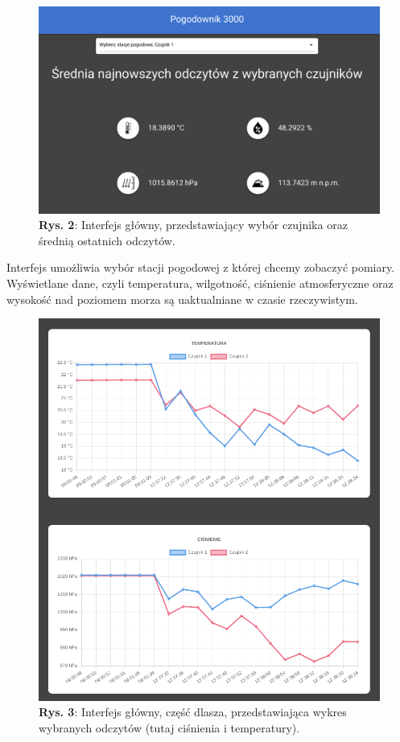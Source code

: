 \documentclass[12pt,a4paper]{article}
\begin{document}
    \begin{figure}[ht]
    \centering
    \includegraphics*[scale=0.3]{int1.png}
    \caption*{\centering \textbf{Rys. 2}: Interfejs główny, przedstawiający wybór czujnika oraz średnią ostatnich odczytów.}
    \end{figure}


    Interfejs umożliwia wybór stacji pogodowej z której chcemy zobaczyć pomiary. Wyświetlane dane, czyli temperatura, wilgotność, ciśnienie atmosferyczne oraz wysokość nad poziomem morza są uaktualniane w czasie rzeczywistym. \\

    \pagebreak
    \begin{figure}[h]
    \centering
    \includegraphics*[scale=0.4]{int2.png}
    \caption*{\centering \textbf{Rys. 3}: Interfejs główny, część dlasza, przedstawiająca wykres wybranych odczytów (tutaj ciśnienia i temperatury).}
    \end{figure}
\end{document}
